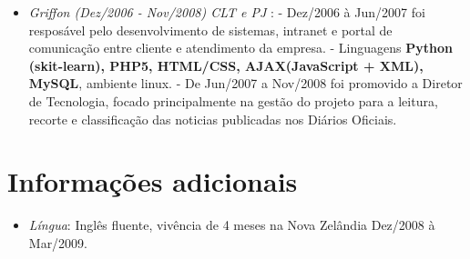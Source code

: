 \documentclass[a4paper,10pt]{article}
\begin{document}
\begin{itemize}
\item \emph{Griffon (Dez/2006 - Nov/2008) CLT e PJ }: 
  \subitem - Dez/2006 à Jun/2007 foi resposável pelo desenvolvimento de sistemas, intranet e portal de comunicação entre cliente e atendimento da empresa. 
  \subitem - Linguagens \textbf{Python (skit-learn), PHP5, HTML/CSS, AJAX(JavaScript + XML), MySQL}, ambiente linux.
  \subitem - De Jun/2007 a Nov/2008 foi promovido a Diretor de Tecnologia, focado principalmente na gestão do projeto para a leitura, recorte e classificação das noticias publicadas nos Diários Oficiais. 

\end{itemize}
\section{Informações adicionais}
\begin{itemize}
\item \emph{Língua}: Inglês fluente, vivência de 4 meses na Nova Zelândia Dez/2008 à Mar/2009.
\end{itemize}
\end{document}
